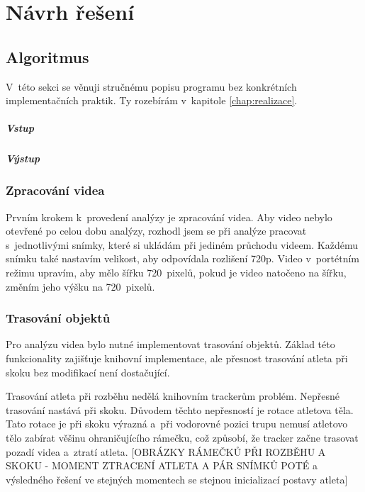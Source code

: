 \chapter{Návrh řešení}

\section{Algoritmus}

V~této sekci se věnuji stručnému popisu programu bez konkrétních implementačních praktik. Ty rozebírám v~kapitole \ref{chap:realizace}.

\paragraph{Vstup}

\paragraph{Výstup}

\subsection{Zpracování videa}

Prvním krokem k~provedení analýzy je zpracování videa. Aby video nebylo otevřené po celou dobu analýzy, rozhodl jsem se při analýze pracovat s~jednotlivými snímky, které si ukládám při jediném průchodu videem. Každému snímku také nastavím velikost, aby odpovídala rozlišení 720p. Video v~portétním režimu upravím, aby mělo šířku 720~pixelů, pokud je video natočeno na šířku, změním jeho výšku na 720~pixelů.

\subsection{Trasování objektů}

Pro analýzu videa bylo nutné implementovat trasování objektů. Základ této funkcionality zajišťuje knihovní implementace, ale přesnost trasování atleta při skoku bez modifikací není dostačující.

Trasování atleta při rozběhu nedělá knihovním trackerům problém. Nepřesné trasování nastává při skoku. Důvodem těchto nepřesností je rotace atletova těla. Tato rotace je při skoku výrazná a~při vodorovné pozici trupu nemusí atletovo tělo zabírat věšinu ohraničujícího rámečku, což způsobí, že tracker začne trasovat pozadí videa a~ztratí atleta. [OBRÁZKY RÁMEČKŮ PŘI ROZBĚHU A SKOKU - MOMENT ZTRACENÍ ATLETA A PÁR SNÍMKŮ POTÉ a výsledného řešení ve stejných momentech se stejnou inicializací postavy atleta]

